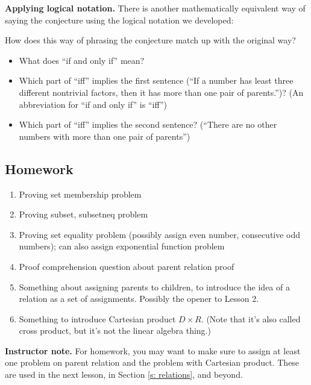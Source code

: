 \documentclass[11pt]{article}
\newcommand\smallnote[1]
	{\begin{mdframed}\raggedright  {\bf Instructor note.} {#1} \end{mdframed}}
\theoremstyle{definition}
\begin{document}
\vfill

{\bf Applying logical notation.} There is another mathematically equivalent way of saying the conjecture using the logical notation we developed:
\begin{mdframed}
\vspace*{1in}
\end{mdframed}
How does this way of phrasing the conjecture match up with the original way? 
	\begin{itemize}
	\item What does ``if and only if'' mean? 
	\item Which part of ``iff'' implies the first sentence (``If a number has least three different nontrivial factors, then it has more than one pair of parents.'')?   (An abbreviation for ``if and only if'' is ``iff'')
	\item Which part of ``iff'' implies the second sentence? (``There are no other numbers with more than one pair of parents'') 
	\end{itemize}
	
\vfill



\newpage \subsection{Homework}  
\begin{enumerate}
\item Proving set membership problem
\item Proving subset, subsetneq problem
\item Proving set equality problem (possibly assign even number, consecutive odd numbers); can also assign exponential function problem
\item Proof comprehension question about parent relation proof
\item Something about assigning parents to children, to introduce the idea of a relation as a set of assignments. Possibly the opener to Lesson 2. 
\item Something to introduce Cartesian product $D\times R$. (Note that it's also called cross product, but it's not the linear algebra thing.)
\end{enumerate}

\smallnote{For homework, you may want to make sure to assign at least one problem on parent relation and the problem with Cartesian product. These are used in the next lesson, in Section \ref{s: relations}, and beyond.}
\end{document}
